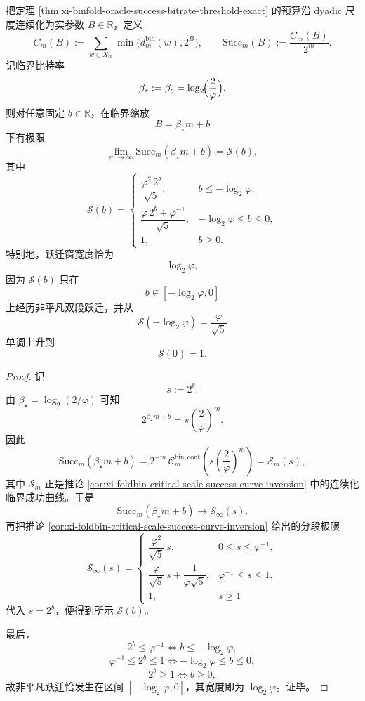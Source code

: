 \begin{theorem}\label{thm:xi-time-part9m2-binfold-sharp-threshold-window-explicit-curve}
把定理 \ref{thm:xi-binfold-oracle-success-bitrate-threshold-exact} 的预算沿 dyadic 尺度连续化为实参数 \(B\in\mathbb R\)，定义
\[
C_m(B):=
\sum_{w\in X_m}\min\bigl(d_m^{\mathrm{bin}}(w),2^B\bigr),
\qquad
\mathrm{Succ}_m(B):=\frac{C_m(B)}{2^m}.
\]
记临界比特率
\[
\beta_\star:=\beta_c=\log_2\!\Bigl(\frac{2}{\varphi}\Bigr).
\]
则对任意固定 \(b\in\mathbb R\)，在临界缩放
\[
B=\beta_\star m+b
\]
下有极限
\[
\lim_{m\to\infty}\mathrm{Succ}_m(\beta_\star m+b)=\mathcal S(b),
\]
其中
\[
\mathcal S(b)=
\begin{cases}
\dfrac{\varphi^2\,2^b}{\sqrt5}, & b\le -\log_2\varphi,\\[1.2ex]
\dfrac{\varphi\,2^b+\varphi^{-1}}{\sqrt5}, & -\log_2\varphi\le b\le 0,\\[1.2ex]
1, & b\ge 0.
\end{cases}
\]
特别地，跃迁窗宽度恰为
\[
\log_2\varphi,
\]
因为 \(\mathcal S(b)\) 只在
\[
b\in[-\log_2\varphi,0]
\]
上经历非平凡双段跃迁，并从
\[
\mathcal S(-\log_2\varphi)=\frac{\varphi}{\sqrt5}
\]
单调上升到
\[
\mathcal S(0)=1.
\]
\end{theorem}
\begin{proof}
记
\[
s:=2^b.
\]
由 \(\beta_\star=\log_2(2/\varphi)\) 可知
\[
2^{\beta_\star m+b}=s\left(\frac{2}{\varphi}\right)^m.
\]
因此
\[
\mathrm{Succ}_m(\beta_\star m+b)
=
2^{-m}\,\mathcal C_m^{\mathrm{bin,cont}}\!\left(
s\left(\frac{2}{\varphi}\right)^m
\right)
=
\mathcal S_m(s),
\]
其中 \(\mathcal S_m\) 正是推论
\ref{cor:xi-foldbin-critical-scale-success-curve-inversion}
中的连续化临界成功曲线。于是
\[
\mathrm{Succ}_m(\beta_\star m+b)\longrightarrow \mathcal S_\infty(s).
\]
再把推论
\ref{cor:xi-foldbin-critical-scale-success-curve-inversion}
给出的分段极限
\[
\mathcal S_\infty(s)=
\begin{cases}
\dfrac{\varphi^2}{\sqrt5}\,s, & 0\le s\le \varphi^{-1},\\[6pt]
\dfrac{\varphi}{\sqrt5}\,s+\dfrac{1}{\varphi\sqrt5}, & \varphi^{-1}\le s\le 1,\\[8pt]
1, & s\ge 1
\end{cases}
\]
代入 \(s=2^b\)，便得到所示 \(\mathcal S(b)\)。

最后，
\[
2^b\le \varphi^{-1}
\iff
b\le -\log_2\varphi,
\]
\[
\varphi^{-1}\le 2^b\le 1
\iff
-\log_2\varphi\le b\le 0,
\]
\[
2^b\ge 1
\iff
b\ge 0,
\]
故非平凡跃迁恰发生在区间 \([-\log_2\varphi,0]\)，其宽度即为 \(\log_2\varphi\)。证毕。
\end{proof}

